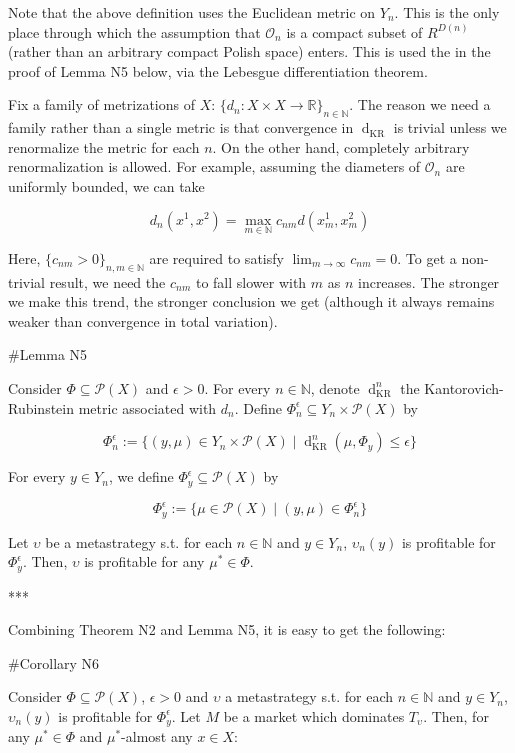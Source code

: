 \documentclass[a4paper]{article}
\newcommand{\Nats}{\mathbb{N}}
\newcommand{\Reals}{\mathbb{R}}
\newcommand{\Prob}{\mathcal{P}}
\newcommand{\Ob}{\mathcal{O}}
\newcommand{\Dkr}{\operatorname{d}_{\text{KR}}}
\begin{document}
Note that the above definition uses the Euclidean metric on ${Y_n}$. This is the only place through which the assumption that ${\Ob_n}$ is a compact subset of ${R^{D(n)}}$ (rather than an arbitrary compact Polish space) enters. This is used the in the proof of Lemma N5 below, via the Lebesgue differentiation theorem.

Fix a family of metrizations of ${X}$: ${\{d_n: X \times X \rightarrow \Reals\}_{n \in \Nats}}$. The reason we need a family rather than a single metric is that convergence in ${\Dkr}$ is trivial unless we renormalize the metric for each ${n}$. On the other hand, completely arbitrary renormalization is allowed. For example, assuming the diameters of $\Ob_n$ are uniformly bounded, we can take 

$$d_n(x^1,x^2)= \max_{m \in \Nats} c_{nm} d(x^1_m,x^2_m)$$

Here, ${\{c_{nm} > 0\}_{n,m \in \Nats}}$ are required to satisfy ${\lim_{m \rightarrow \infty} c_{nm} = 0}$. To get a non-trivial result, we need the ${c_{nm}}$ to fall slower with ${m}$ as ${n}$ increases. The stronger we make this trend, the stronger conclusion we get (although it always remains weaker than convergence in total variation).

\#Lemma N5

Consider ${\Phi \subseteq \Prob(X)}$ and ${\epsilon > 0}$. For every ${n \in \Nats}$, denote ${\Dkr^n}$ the Kantorovich-Rubinstein metric associated with ${d_n}$. Define ${\Phi_n^\epsilon \subseteq Y_n \times \Prob(X)}$ by 

$$\Phi_n^\epsilon:=\{(y,\mu) \in Y_n \times \Prob(X) \mid \Dkr^n(\mu,\Phi_y) \leq \epsilon\}$$

For every ${y \in Y_n}$, we define ${\Phi^\epsilon_y \subseteq \Prob(X)}$ by

$$\Phi^\epsilon_y:=\{\mu \in \Prob(X) \mid (y,\mu) \in \Phi^\epsilon_n\}$$

Let ${\upsilon}$ be a metastrategy s.t. for each ${n \in \Nats}$ and ${y \in Y_n}$, ${\upsilon_n(y)}$ is profitable for ${\Phi^\epsilon_y}$. Then, ${\upsilon}$ is profitable for any ${\mu^* \in \Phi}$.

***

Combining Theorem N2 and Lemma N5, it is easy to get the following:

\#Corollary N6

Consider ${\Phi \subseteq \Prob(X)}$, ${\epsilon > 0}$ and ${\upsilon}$ a metastrategy s.t. for each ${n \in \Nats}$ and ${y \in Y_n}$, ${\upsilon_n(y)}$ is profitable for ${\Phi^\epsilon_y}$. Let ${M}$ be a market which dominates ${T_\upsilon}$. Then, for any ${\mu^* \in \Phi}$ and ${\mu^*}$-almost any ${x \in X}$:
\end{document}
